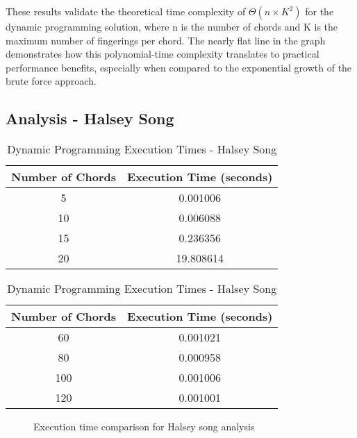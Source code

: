 \documentclass[conference]{IEEEtran}
\begin{document}
These results validate the theoretical time complexity of \(\Theta(n \times K^2)\) for the dynamic programming solution, where n is the number of chords and K is the maximum number of fingerings per chord. The nearly flat line in the graph demonstrates how this polynomial-time complexity translates to practical performance benefits, especially when compared to the exponential growth of the brute force approach.

\subsection{Analysis - Halsey Song}

\begin{table}[H]
\centering
\caption{Brute Force Execution Times - Halsey Song}
\begin{tabular}{|c|c|}
\hline
\textbf{Number of Chords} & \textbf{Execution Time (seconds)} \\
\hline
5 & 0.001006 \\
10 & 0.006088 \\
15 & 0.236356 \\
20 & 19.808614 \\
\hline
\end{tabular}
\caption{Dynamic Programming Execution Times - Halsey Song}
\begin{tabular}{|c|c|}
\hline
\textbf{Number of Chords} & \textbf{Execution Time (seconds)} \\
\hline
60 & 0.001021 \\
80 & 0.000958 \\
100 & 0.001006 \\
120 & 0.001001 \\
\hline
\end{tabular}
\label{tab:halsey_analysis_times}
\end{table}

\begin{figure}[H]
\caption{Execution time comparison for Halsey song analysis}
\label{fig:halsey_bf_graph}
\end{figure}
\end{document}
